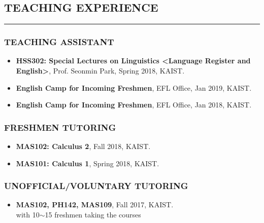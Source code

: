 \documentclass[10pt,a4]{article}
\begin{document}
\begin{small}
\subsection*{TEACHING EXPERIENCE}
\hrule
\vspace{0.2cm}

\subsubsection*{TEACHING ASSISTANT}
\begin{itemize}


\item {\bf HSS302: Special Lectures on Linguistics \textless Language Register and English\textgreater}, Prof. Seonmin Park, Spring 2018, KAIST.

\item {\bf English Camp for Incoming Freshmen}, EFL Office, Jan 2019, KAIST.

\item {\bf English Camp for Incoming Freshmen}, EFL Office, Jan 2018, KAIST.

\end{itemize}

\subsubsection*{FRESHMEN TUTORING}
\begin{itemize}

\item {\bf MAS102: Calculus 2}, Fall 2018, KAIST.

\item {\bf MAS101: Calculus 1}, Spring 2018, KAIST.

\end{itemize}

\subsubsection*{UNOFFICIAL/VOLUNTARY TUTORING}
\begin{itemize}

\item {\bf MAS102, PH142, MAS109}, Fall 2017, KAIST. \\
with 10$\sim$15 freshmen taking the courses


\end{itemize}
\end{small}
\end{document}
